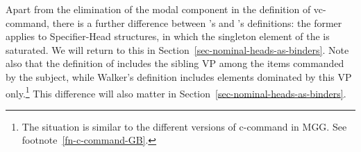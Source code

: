 \documentclass[output=paper,biblatex,babelshorthands,newtxmath,draftmode,colorlinks,citecolor=brown]{langscibook}
\begin{document}

Apart from the elimination of the modal component in the definition of vc-command, there is a further
difference between \citeauthor{HL95b}'s and \citeauthor{Walker2011a}'s definitions: the former
applies to Specifier-Head structures, in which the singleton element of the \sprl is saturated. We
will return to this in Section~\ref{sec-nominal-heads-as-binders}. Note also that the definition of
\citeauthor{HL95b} includes the sibling VP among the items commanded by the subject, while Walker's
definition includes elements dominated by this VP only.\footnote{%
  The situation is similar to the different versions of c-command in MGG. See footnote~\ref{fn-c-command-GB}.
}
This difference will also matter in Section~\ref{sec-nominal-heads-as-binders}.
\end{document}
